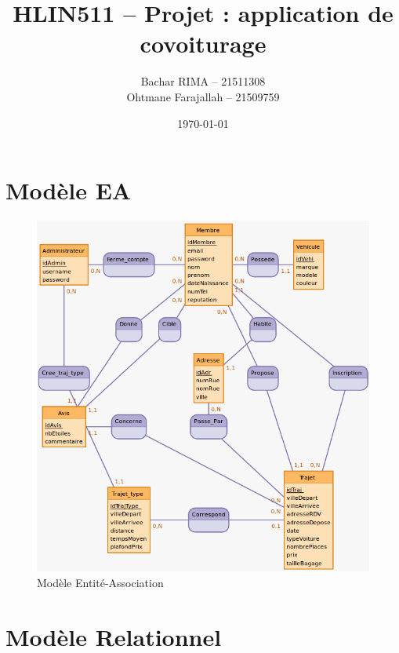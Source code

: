 \documentclass[a4paper,12pt]{article}
\title{HLIN511 -- Projet : \textbf{application de covoiturage}}
\author{Bachar RIMA -- 21511308\\ Ohtmane Farajallah -- 21509759}
\date{\today{}}
\theoremstyle{remark}
\begin{document}
\pagestyle{plain}

\maketitle
{
  \hypersetup{linkcolor=black}
  \tableofcontents
}

\newpage

\section*{Modèle EA}
\label{sec:modele_EA}

\begin{figure}[!ht]
  \centering
  \includegraphics[scale=0.5]{images/modele_EA.png}
  \caption{Modèle Entité-Association}
\end{figure}

\section*{Modèle Relationnel}
\label{sec:modele_relationnel}
\end{document}
